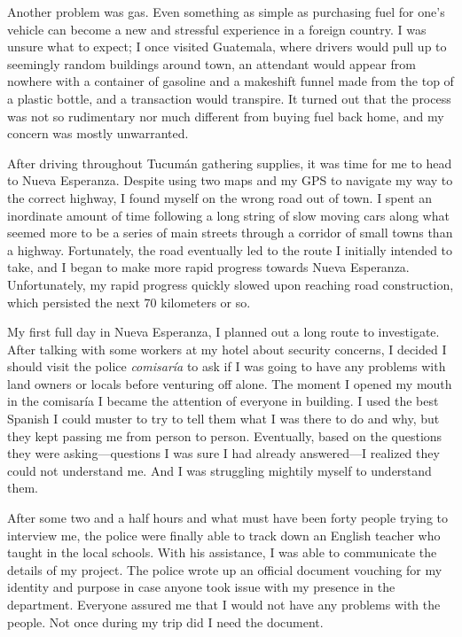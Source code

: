 Another problem was gas. Even something as simple as purchasing fuel for one’s vehicle can become a new and stressful experience in a foreign country. I was unsure what to expect; I once visited Guatemala, where drivers would pull up to seemingly random buildings around town, an attendant would appear from nowhere with a container of gasoline and a makeshift funnel made from the top of a plastic bottle, and a transaction would transpire. It turned out that the process was not so rudimentary nor much different from buying fuel back home, and my concern was mostly unwarranted.

After driving throughout Tucumán gathering supplies, it was time for me to head to Nueva Esperanza. Despite using two maps and my GPS to navigate my way to the correct highway, I found myself on the wrong road out of town. I spent an inordinate amount of time following a long string of slow moving cars along what seemed more to be a series of main streets through a corridor of small towns than a highway. Fortunately, the road eventually led to the route I initially intended to take, and I began to make more rapid progress towards Nueva Esperanza.
Unfortunately, my rapid progress quickly slowed upon reaching road construction, which persisted the next 70 kilometers or so.

My first full day in Nueva Esperanza, I planned out a long route to investigate. After talking with some workers at my hotel about security concerns, I decided I should visit the police \textit{comisaría} to ask if I was going to have any problems with land owners or locals before venturing off alone. The moment I opened my mouth in the comisaría I became the attention of everyone in building. I used the best Spanish I could muster to try to tell them what I was there to do and why, but they kept passing me from person to person. Eventually, based on the questions they were asking---questions I was sure I had already answered---I realized they could not understand me. And I was struggling mightily myself to understand them.

After some two and a half hours and what must have been forty people trying to interview me, the police were finally able to track down an English teacher who taught in the local schools. With his assistance, I was able to communicate the details of my project. The police wrote up an official document vouching for my identity and purpose in case anyone took issue with my presence in the department. Everyone assured me that I would not have any problems with the people. Not once during my trip did I need the document.

